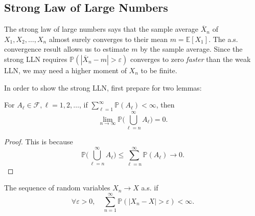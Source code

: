 %
%
%
%
%
%

\subsection{Strong Law of Large Numbers}

The strong law of large numbers says that the sample average $\overline{X}_n$ of $X_1,X_2,\ldots,X_n$ almost surely converges to their mean $m=\mathbb{E}[X_1]$.
The a.s. convergence result allows us to estimate $m$ by the sample average.
Since the strong LLN requires $\mathbb{P}(|\overline{X}_n-m|>\varepsilon)$ converges to zero \emph{faster} than the weak LLN, we may need a higher moment of $X_n$ to be finite.

In order to show the strong LLN, first prepare for two lemmas:
\begin{proposition}
For $A_{\ell}\in\mathcal{F}, \ell=1,2,\ldots$, if $\sum_{\ell=1}^\infty\mathbb{P}(A_{\ell})<\infty$,
then
\[
\lim_{n\to\infty}\mathbb{P}\bigg(
\bigcup_{\ell=n}^\infty A_{\ell}
\bigg)=0.
\]
\end{proposition}
\begin{proof}
This is because
\[
\mathbb{P}\bigg(
\bigcup_{\ell=n}^\infty A_{\ell}
\bigg)
\le \sum_{\ell=n}^\infty\mathbb{P}(A_{\ell})\to0.
\]
\end{proof}

\begin{proposition}\label{pro:3:7}
The sequence of random variables $X_n\to X$ a.s. if 
\[\forall\varepsilon>0,\quad
\sum_{n=1}^\infty \mathbb{P}(|X_n - X|>\varepsilon)<\infty.
\]
\end{proposition}

